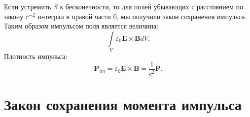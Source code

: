 \documentclass[a4paper,14pt]{extreport} %
\renewcommand{\vec}[1]{\boldsymbol{#1}}
\newcommand{\eps}{\varepsilon}
\begin{document}
	Если устремить $S$ к бесконечности, то для полей убывающих с расстоянием по закону $r^{-2}$ интеграл в правой части 0, мы получили закон сохранения импульса. Таким образом импульсом поля является величина:
	\begin{equation*}
		\int\limits_{V} \eps_0 \vec{E}\times\vec{B} dV.
	\end{equation*}
	Плотность импульса:
	\begin{equation*}
		\vec{P}_{im} = \eps_0 \vec{E}\times\vec{B} = \frac{1}{c^2} \vec{P}.
	\end{equation*}
	
	\section{Закон сохранения момента импульса}
	
\end{document}
